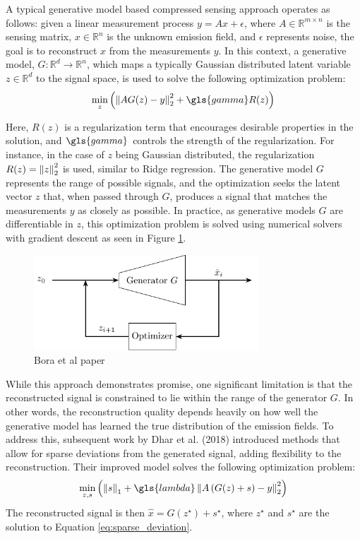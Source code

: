 A typical generative model based compressed sensing approach operates as follows: given a linear measurement process $y = Ax + \epsilon$, where $A \in \mathbb{R}^{m \times n}$ is the sensing matrix, $x \in \mathbb{R}^n$ is the unknown emission field, and $\epsilon$ represents noise, the goal is to reconstruct $x$ from the measurements $y$.
In this context, a generative model, $G: \mathbb{R}^d \to \mathbb{R}^n$, which maps a typically Gaussian distributed latent variable $z \in \mathbb{R}^d$ to the signal space, is used to solve the following optimization problem:
\begin{equation}
    \min_{z}{\left( \norm{A G(z) - y}_2^2 + \gls{gamma} R(z) \right)}
\end{equation}

Here, $R(z)$ is a regularization term that encourages desirable properties in the solution, and $\gls{gamma}$ controls the strength of the regularization.
For instance, in the case of $z$ being Gaussian distributed, the regularization $R(z) = \left\lVert z\right\rVert_2^2$ is used, similar to Ridge regression.
The generative model $G$ represents the range of possible signals, and the optimization seeks the latent vector $z$ that, when passed through $G$, produces a signal that matches the measurements $y$ as closely as possible.
In practice, as generative models $G$ are differentiable in $z$, this optimization problem is solved using numerical solvers with gradient descent as seen in Figure \ref{fig:gen_solver}.
\begin{figure}[h!]
    \centering
    \includegraphics[width=0.75\textwidth]{figures/02_related_work/latent_variable_optimization/build/latent_variable_optimization.pdf}
    \caption{Bora et al paper}
    \label{fig:gen_solver}
\end{figure}

While this approach demonstrates promise, one significant limitation is that the reconstructed signal is constrained to lie within the range of the generator $G$.
In other words, the reconstruction quality depends heavily on how well the generative model has learned the true distribution of the emission fields.
To address this, subsequent work by Dhar et al. (2018) introduced methods that allow for sparse deviations from the generated signal, adding flexibility to the reconstruction.
Their improved model solves the following optimization problem:
\begin{equation}
    \min_{z, s}{\left(\norm{s}_1 + \gls{lambda} \norm{A \left( G(z) + s \right) - y}_2^2 \right)}
    \label{eq:sparse_deviation}
\end{equation}
The reconstructed signal is then $\hat{x} = G(z^\star) + s^\star$, where $z^\star$ and $s^\star$ are the solution to Equation \ref{eq:sparse_deviation}.

